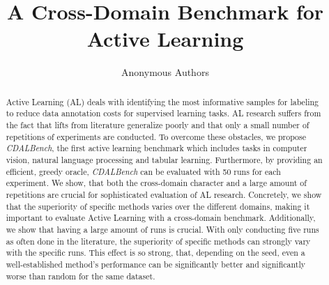 \documentclass[]{article}
\title{A Cross-Domain Benchmark for Active Learning}
\author{%
	Anonymous Authors
}
\begin{document}
	


\maketitle


\begin{abstract}

Active Learning (AL) deals with identifying the most informative samples for
labeling to reduce data annotation costs for supervised learning tasks. AL
research suffers from the fact that lifts from literature generalize poorly and
that only a small number of repetitions of experiments are conducted. To overcome
these obstacles, we propose \emph{CDALBench}, the first active learning benchmark
which includes tasks in computer vision, natural language processing and tabular
learning. Furthermore, by providing an efficient, greedy oracle, \emph{CDALBench}
can be evaluated with 50 runs for each experiment. We show, that both the
cross-domain character and a large amount of repetitions are crucial for
sophisticated evaluation of AL research. Concretely, we show that the
superiority of specific methods varies over the different domains, making it
important to evaluate Active Learning with a cross-domain benchmark.
Additionally, we show that having a large amount of runs is crucial. With only
conducting five runs as often done in the literature, the superiority of
specific methods can strongly vary with the specific runs. This effect is so strong, that, depending on the seed, even a well-established method's performance can be significantly better and significantly
worse than random for the same dataset. 
\end{abstract}

\end{document}
